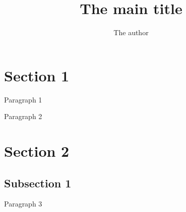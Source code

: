 \documentclass[man]{apa6}
\title{The main title}
\author{The author}
\begin{document}
\section{Section 1}

Paragraph 1

Paragraph 2

\section{Section 2} 

\subsection{Subsection 1}

Paragraph 3



\end{document}
